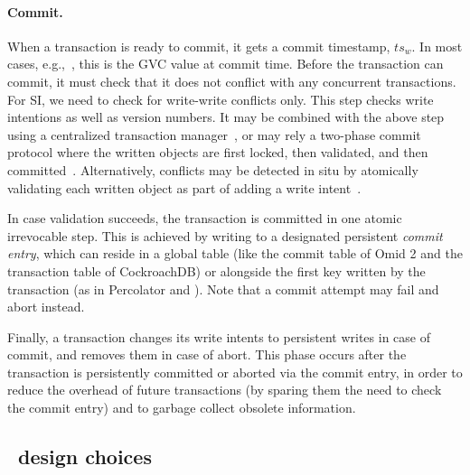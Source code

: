   \paragraph{Commit.} 
  When a transaction is ready to commit, it gets a commit timestamp, $ts_w$. 
  In most cases, e.g.,~\cite{Percolator2010,tephra,OmidICDE2014,omid-blog}, 
  this is the GVC value at commit time. 
  Before the transaction can commit, it must check that it does not conflict with any 
  concurrent transactions.  For SI, we need to check for write-write conflicts only. 
  This step checks write intentions as well as version numbers. It may be combined  with the above step using a centralized 
  transaction manager~\cite{OmidICDE2014,tephra,omid-blog}, or may rely a two-phase commit protocol where the written objects are first 
  locked, then validated, and then committed~\cite{Percolator2010}. 
 Alternatively, conflicts may be detected in situ by atomically validating each written object as part of adding a write  intent~\cite{cockroach}.
 
 In case validation succeeds, the transaction is committed 
  in one atomic irrevocable  step. This is achieved by writing to a designated persistent \emph{commit entry}, 
  which can reside in a global table (like the commit table of 
  Omid 2 and the transaction table of CockroachDB) or alongside the first  key written by 
  the transaction (as in Percolator and \sys).  Note that a commit attempt may fail and abort instead. 
 
  Finally, a transaction changes its write intents to
  persistent writes in case of commit, and removes them in case of abort. This
  phase occurs after the transaction is persistently committed or aborted via the commit entry, in
  order to reduce the overhead of future transactions (by sparing them the need to check the commit entry)
  and to garbage collect   obsolete information. 
  


 

\subsection{\sys\ design choices}
\label{ssec:ll-txns}


